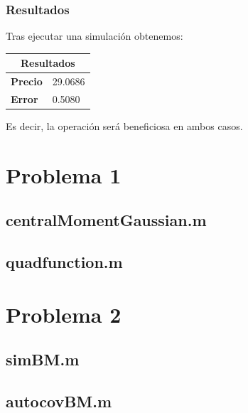 \documentclass[a4paper,11pt]{article}
\begin{document}
\subsubsection{Resultados}

Tras ejecutar una simulaci\'on obtenemos:

\begin{center}
\begin{tabular}{|p{3.5cm}|p{3.5cm}|}
\hline
\multicolumn{2}{|c|}{\textbf{Resultados}}\\
\hline
\hline
\textbf{Precio}     & 29.0686\\
\hline
\textbf{Error}      & 0.5080\\
\hline
\end{tabular}
\end{center}

Es decir, la operaci\'on ser\'a beneficiosa en ambos casos.

\pagebreak

\newpage
\mbox{}

\pagebreak

\appendix
  \section{Problema 1}
    \subsection{centralMomentGaussian.m}

    
    \subsection{quadfunction.m}
    

  \pagebreak
  \section{Problema 2}
    \subsection{simBM.m}
    
    \subsection{autocovBM.m}
    
\end{document}
